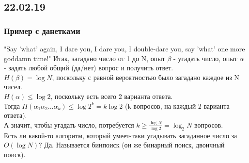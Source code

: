 \subsection{22.02.19}
\subsubsection{Пример с данетками}
"Say 'what' again, I dare you, I dare you, I double-dare you, say 'what' one more goddamn time!"
Итак, загадано число от 1 до N, опыт $\beta$ - угадать число, опыт $\alpha$ - задать любой общий (да/нет) вопрос и получить ответ.\\
$H(\beta) = \log N$, поскольку с равной вероятностью было загадано каждое из N чисел.\\
$H(\alpha) \leq \log 2$, поскольку есть всего 2 варианта ответа.\\
Тогда $H(\alpha_1\alpha_2...\alpha_k) \leq \log 2^k = k \log 2$ (k вопросов, на каждый 2 варианта ответа).\\
А значит, чтобы угадать число, потребуется $k \geq \frac{\log N}{\log 2} = \log_2 N$ вопросов.\\
Есть ли какой-то алгоритм, который умеет-таки угадывать загаданное число за $O(\log N)$? Да. Называется бинпоиск (он же бинарный поиск, двоичный поиск).
